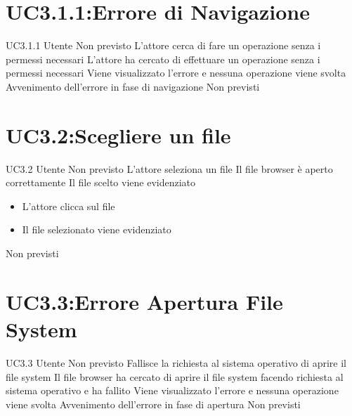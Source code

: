 \documentclass[../AnalisideiRequisiti.tex]{subfiles}
\begin{document}
	\section{UC3.1.1:Errore di Navigazione}
	\UserCase
	{UC3.1.1}
	{Utente}
	{Non previsto}
	{L'attore cerca di fare un operazione senza i permessi necessari}
	{L'attore ha cercato di effettuare un operazione senza i permessi necessari}
	{Viene visualizzato l'errore e nessuna operazione viene svolta}
	{Avvenimento dell'errore in fase di navigazione}
	{Non previsti}

	\section{UC3.2:Scegliere un file}
\UserCase
{UC3.2}
{Utente}
{Non previsto}
{L'attore seleziona un file}
{Il file browser è aperto correttamente}
{Il file scelto viene evidenziato}
{
	\begin{itemize}
		\item{} L'attore clicca sul file
		\item{} Il file selezionato viene evidenziato
	\end{itemize}
}
{Non previsti}

\section{UC3.3:Errore Apertura File System}
\UserCase
{UC3.3}
{Utente}
{Non previsto}
{Fallisce la richiesta al sistema operativo di aprire il file system}
{Il file browser ha cercato di aprire il file system facendo richiesta al sistema operativo e ha fallito}
{Viene visualizzato l'errore e nessuna operazione viene svolta}
{Avvenimento dell'errore in fase di apertura}
{Non previsti}
\end{document}
